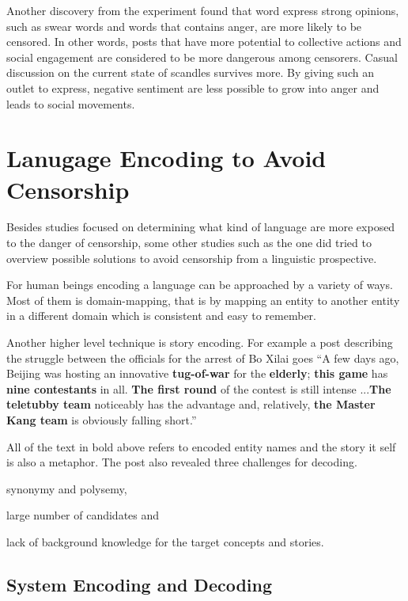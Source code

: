 \documentclass[11pt]{article} %
\begin{document}
Another discovery from the experiment found that word express strong opinions, such as swear words and words that contains anger, are more likely to be censored. In other words, posts that have more potential to collective actions and social engagement are considered to be more dangerous among censorers. Casual discussion on the current state of scandles survives more. By giving such an outlet to express, negative sentiment are less possible to grow into anger and leads to social movements.

\section{Lanugage Encoding to Avoid Censorship}

Besides studies focused on determining what kind of language are more exposed to the danger of censorship, some other studies such as the one \cite{ji2018creative} did tried to overview possible solutions to avoid censorship from a linguistic prospective.

For human beings encoding a language can be approached by a variety of ways. Most of them is domain-mapping, that is by mapping an entity to another entity in a different domain which is consistent and easy to remember. 

Another higher level technique is story encoding. For example a post describing the struggle between the officials for the arrest of Bo Xilai goes ``A few days ago, Beijing was hosting an innovative \textbf{tug-of-war} for the \textbf{elderly}; \textbf{this game} has \textbf{nine contestants} in all. \textbf{The first round} of the contest is still intense ...\textbf{The teletubby team} noticeably has the advantage and, relatively, \textbf{the Master Kang team} is obviously falling short.''

All of the text in bold above refers to encoded entity names and the story it self is also a metaphor. The post also revealed three challenges for decoding.
\begin {enumerate*}[label=\emph{\alph*})]
\item synonymy and polysemy,  \item large number of candidates and \item lack of background knowledge for the target concepts and stories.
\end {enumerate*}

\subsection{System Encoding and Decoding}
\end{document}
